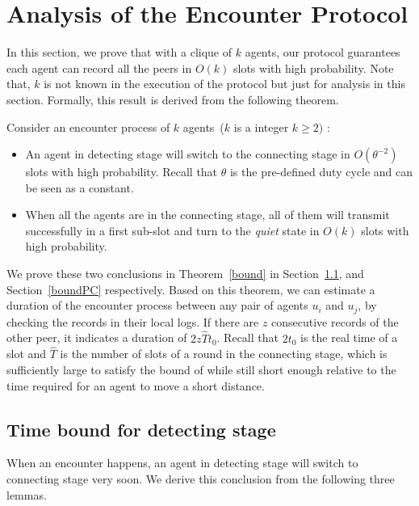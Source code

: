 \section{Analysis of the Encounter Protocol}
\label{sectionanalysis}

In this section, we prove that with a clique of $k$ agents,  
our protocol guarantees each agent can record all
the peers in $O(k)$ slots with high probability.
Note that, $k$ is not known in the execution of the protocol but just for analysis
in this section.
Formally, this result is derived from the following theorem.
\begin{theorem}
    \label{bound}
    Consider an encounter process of $k$ agents~($k$ is a integer $k \geq 2)$ :
    \begin{itemize} 
    \item[(1)] An agent in detecting stage  will switch to the connecting stage in $O(\theta^{-2})$
    slots with high probability. Recall that $\theta$ is the pre-defined duty cycle and can be seen 
    as a constant.
    \item[(2)] When all the agents are in the connecting stage, all of them will
    transmit successfully in a first sub-slot and turn to the \emph{quiet} state 
    in $O(k)$ slots with high probability.
    \end{itemize}
\end{theorem}

We prove these two conclusions in Theorem~\ref{bound} in Section~\ref{boundSW}, and
Section~\ref{boundPC} respectively. 
Based on this theorem, we can
estimate a duration of the encounter process
between any pair of agents $u_i$ and $u_j$, 
by checking the records in their local logs.  
If there are $z$ consecutive records of the other peer, it indicates a 
duration of $2z\hat{T}t_0$. Recall that $2t_0$ is the real time 
of a slot and $\hat{T}$ is the number of slots of a round in 
the connecting stage, which is 
sufficiently large to satisfy the bound 
of {\pName}  while still short enough relative to the 
time required for an agent to move a short distance. 

\subsection{Time bound for detecting stage}
\label{boundSW}

When an encounter happens, an agent in detecting stage will switch to connecting stage very soon. 
We derive this conclusion from the following three lemmas.

